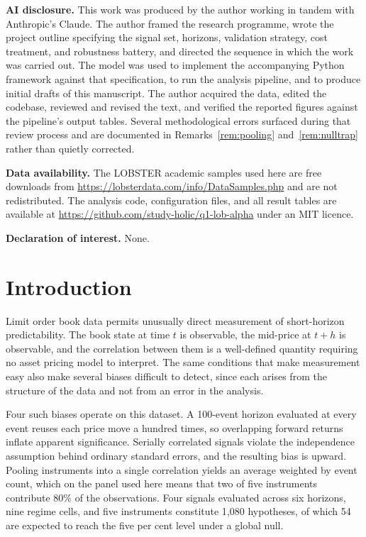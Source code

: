 \documentclass[11pt]{scrartcl}
\begin{document}
\vspace{0.8em}
\noindent\textbf{AI disclosure.} This work was produced by the author working in tandem with Anthropic's Claude. The author framed the research programme, wrote the project outline specifying the signal set, horizons, validation strategy, cost treatment, and robustness battery, and directed the sequence in which the work was carried out. The model was used to implement the accompanying Python framework against that specification, to run the analysis pipeline, and to produce initial drafts of this manuscript. The author acquired the data, edited the codebase, reviewed and revised the text, and verified the reported figures against the pipeline's output tables. Several methodological errors surfaced during that review process and are documented in Remarks~\ref{rem:pooling} and~\ref{rem:nulltrap} rather than quietly corrected.

\noindent\textbf{Data availability.} The LOBSTER academic samples used here are free downloads from \url{https://lobsterdata.com/info/DataSamples.php} and are not redistributed. The analysis code, configuration files, and all result tables are available at \url{https://github.com/study-holic/q1-lob-alpha} under an MIT licence.

\noindent\textbf{Declaration of interest.} None.

\newpage
\tableofcontents
\listoffigures
\listoftables
\newpage

\section{Introduction}
\label{sec:intro}

Limit order book data permits unusually direct measurement of short-horizon predictability. The book state at time $t$ is observable, the mid-price at $t+h$ is observable, and the correlation between them is a well-defined quantity requiring no asset pricing model to interpret. The same conditions that make measurement easy also make several biases difficult to detect, since each arises from the structure of the data and not from an error in the analysis.

Four such biases operate on this dataset. A 100-event horizon evaluated at every event reuses each price move a hundred times, so overlapping forward returns inflate apparent significance. Serially correlated signals violate the independence assumption behind ordinary standard errors, and the resulting bias is upward. Pooling instruments into a single correlation yields an average weighted by event count, which on the panel used here means that two of five instruments contribute 80\% of the observations. Four signals evaluated across six horizons, nine regime cells, and five instruments constitute 1{,}080 hypotheses, of which 54 are expected to reach the five per cent level under a global null.
\end{document}
